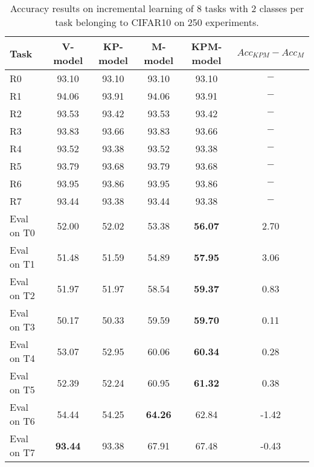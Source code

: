 \begin{table}[H]
\centering
\begin{tabular}{lccccc}
\toprule
Task  & V-model & KP-model & M-model & KPM-model & $Acc_{KPM}-Acc_{M}$ \\
\midrule
R0 & 93.10 & 93.10 & 93.10 & 93.10 & $-$ \\
R1 & 94.06 & 93.91 & 94.06 & 93.91 & $-$ \\
R2 & 93.53 & 93.42 & 93.53 & 93.42 & $-$ \\
R3 & 93.83 & 93.66 & 93.83 & 93.66 & $-$ \\
R4 & 93.52 & 93.38 & 93.52 & 93.38 & $-$ \\
R5 & 93.79 & 93.68 & 93.79 & 93.68 & $-$ \\
R6 & 93.95 & 93.86 & 93.95 & 93.86 & $-$ \\
R7 & 93.44 & 93.38 & 93.44 & 93.38 & $-$ \\

 \hline 
Eval on T0 & 52.00 & 52.02 & 53.38 & \textbf{56.07} & 2.70 \\
Eval on T1 & 51.48 & 51.59 & 54.89 & \textbf{57.95} & 3.06 \\
Eval on T2 & 51.97 & 51.97 & 58.54 & \textbf{59.37} & 0.83 \\
Eval on T3 & 50.17 & 50.33 & 59.59 & \textbf{59.70} & 0.11 \\
Eval on T4 & 53.07 & 52.95 & 60.06 & \textbf{60.34} & 0.28 \\
Eval on T5 & 52.39 & 52.24 & 60.95 & \textbf{61.32} & 0.38 \\
Eval on T6 & 54.44 & 54.25 & \textbf{64.26} & 62.84 & -1.42 \\
Eval on T7 & \textbf{93.44} & 93.38 & 67.91 & 67.48 & -0.43 \\
\bottomrule
\end{tabular}
\caption{Accuracy results on incremental learning of 8 tasks with 2 classes per task belonging to CIFAR10 on 250 experiments.}
\end{table}
